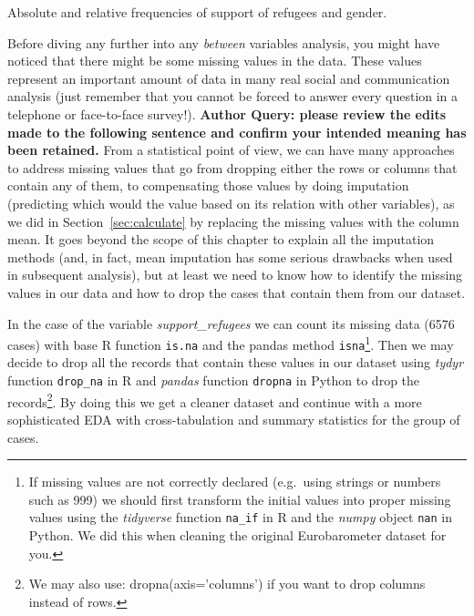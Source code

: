 \begin{ccsexample}
\caption{Absolute and relative frequencies of support of refugees and gender.}
\end{ccsexample}


Before diving any further into any \textit{between} variables analysis, you might have noticed that there might be some missing values in the data. These values represent an important amount of data in many real social and communication analysis (just remember that you cannot be forced to answer  every question in a telephone or face-to-face survey!). {\bf Author Query:  please review the edits made to the following sentence and confirm your intended meaning has been retained.} From a statistical point of view, we can have many approaches to address missing values that go from dropping either the rows or columns that contain any of them, to compensating those values by doing imputation (predicting which would the value based on its relation with other variables), as we did in Section~\ref{sec:calculate} by replacing the missing values with the column mean. It goes beyond the scope of this chapter to explain all the imputation methods (and, in fact, mean imputation has some serious drawbacks when used in subsequent analysis), but at least we need to know how to identify the missing values in our data and how to drop the cases that contain them from our dataset.

In the case of the variable \textit{support\_refugees} we can count its missing data (6576 cases) with base R function \texttt{is.na} and the pandas method \texttt{isna}\footnote{If missing values are not correctly declared (e.g.\ using strings or numbers such as 999) we should first transform the initial values into proper missing values using the \emph{tidyverse} function \texttt{na\_if} in R and the \emph{numpy} object \texttt{nan} in Python. We  did this when cleaning the original Eurobarometer dataset for you.}.  Then we may decide to drop all the records that contain these values in our dataset using \emph{tydyr} function \texttt{drop\_na} in R and \emph{pandas} function \texttt{dropna} in Python to drop the records\footnote{We may also use: dropna(axis='columns') if you want to drop columns instead of rows.}. By doing this we get a cleaner dataset and continue with a more sophisticated EDA with cross-tabulation and summary statistics for the group of cases.	

